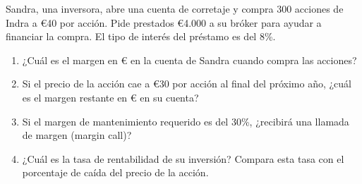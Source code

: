 \begin{ejercicio}
Sandra, una inversora, abre una cuenta de corretaje y compra 300 acciones de Indra a €40 por acción. Pide prestados €4.000 a su bróker para ayudar a financiar la compra. El tipo de interés del préstamo es del 8\%.

\begin{enumerate}
\item ¿Cuál es el margen en € en la cuenta de Sandra cuando compra las acciones?
\item Si el precio de la acción cae a €30 por acción al final del próximo año, ¿cuál es el margen restante en € en su cuenta?
\item Si el margen de mantenimiento requerido es del 30\%, ¿recibirá una llamada de margen (margin call)?
\item ¿Cuál es la tasa de rentabilidad de su inversión? Compara esta tasa con el porcentaje de caída del precio de la acción.
\end{enumerate}
\end{ejercicio}

